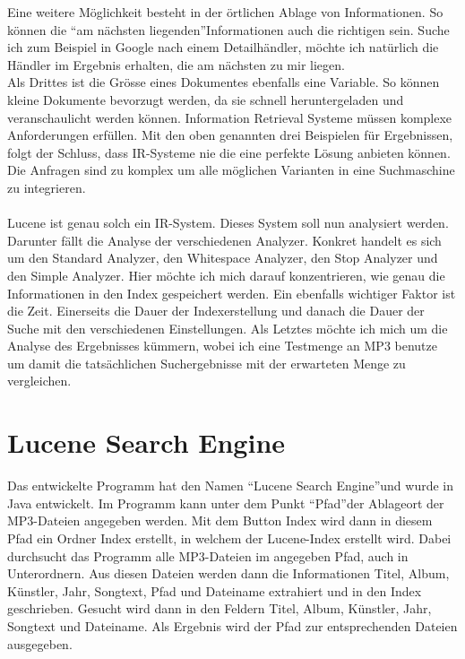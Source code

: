 \documentclass[12pt,a4paper,ngerman]{report}
\begin{document}
Eine weitere Möglichkeit besteht in der örtlichen Ablage von Informationen. So können die \textquotedblleft am nächsten liegenden\textquotedblright Informationen auch die richtigen sein. Suche ich zum Beispiel in Google nach einem Detailhändler, möchte ich natürlich die Händler im Ergebnis erhalten, die am nächsten zu mir liegen.\\
Als Drittes ist die Grösse eines Dokumentes ebenfalls eine Variable. So können kleine Dokumente bevorzugt werden, da sie schnell heruntergeladen und veranschaulicht werden können.
\newpage
Information Retrieval Systeme müssen komplexe Anforderungen erfüllen. Mit den oben genannten drei Beispielen für Ergebnissen, folgt der Schluss, dass IR-Systeme nie die eine perfekte Lösung anbieten können. Die Anfragen sind zu komplex um alle möglichen Varianten in eine Suchmaschine zu integrieren.\\
\\
Lucene ist genau solch ein IR-System. Dieses System soll nun analysiert werden. Darunter fällt die Analyse der verschiedenen Analyzer. Konkret handelt es sich um den Standard Analyzer, den Whitespace Analyzer, den Stop Analyzer und den Simple Analyzer. Hier möchte ich mich darauf konzentrieren, wie genau die Informationen in den Index gespeichert werden. Ein ebenfalls wichtiger Faktor ist die Zeit. Einerseits die Dauer der Indexerstellung und danach die Dauer der Suche mit den verschiedenen Einstellungen. Als Letztes möchte ich mich um die Analyse des Ergebnisses kümmern, wobei ich eine Testmenge an MP3 benutze um damit die tatsächlichen Suchergebnisse mit der erwarteten Menge zu vergleichen.
\section*{Lucene Search Engine}
Das entwickelte Programm hat den Namen \textquotedblleft Lucene Search Engine\textquotedblright und wurde in Java entwickelt. Im Programm kann unter dem Punkt \textquotedblleft Pfad\textquotedblright der Ablageort der MP3-Dateien angegeben werden. Mit dem Button Index wird dann in diesem Pfad ein Ordner Index erstellt, in welchem der Lucene-Index erstellt wird. Dabei durchsucht das Programm alle MP3-Dateien im angegeben Pfad, auch in Unterordnern. Aus diesen Dateien werden dann die Informationen Titel, Album, Künstler, Jahr, Songtext, Pfad und Dateiname extrahiert und in den Index geschrieben. Gesucht wird dann in den Feldern Titel, Album, Künstler, Jahr, Songtext und Dateiname. Als Ergebnis wird der Pfad zur entsprechenden Dateien ausgegeben.
\newpage
\end{document}
